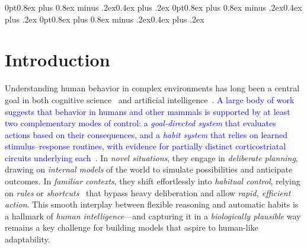 \documentclass{article} %
\newcommand{\revise}[1]{\textcolor{blue}{#1}}
\begin{document}
\titlespacing*{\section}
{0pt}{0.8ex plus 0.8ex minus .2ex}{0.4ex plus .2ex}
\titlespacing*{\subsection}
{0pt}{0.8ex plus 0.8ex minus .2ex}{0.4ex plus .2ex}
\titlespacing*{\subsubsection}
{0pt}{0.8ex plus 0.8ex minus .2ex}{0.4ex plus .2ex}

\setlength{\abovedisplayskip}{0.5pt}
\setlength{\abovedisplayshortskip}{0pt}
\setlength{\belowdisplayskip}{0.5pt}
\setlength{\belowdisplayshortskip}{0pt}
\setlength{\jot}{2pt}
\setlength{\floatsep}{1.2ex}
\setlength{\textfloatsep}{1.2ex}
\setlength{\intextsep}{0.5ex}
\setlength{\topsep}{0.3ex}
\setlength{\partopsep}{0pt}
\setlength{\parskip}{0.3ex}

\section{Introduction}
\label{sec:intro}

Understanding human behavior in complex environments has long been a central goal in both cognitive science~\citep{pylyshyn1980computation} and artificial intelligence~\citep{leichtmann2023effects}. \revise{A large body of work suggests that behavior in humans and other mammals is supported by at least two complementary modes of control: a {\it goal-directed system} that evaluates actions based on their consequences, and a {\it habit system} that relies on learned stimulus–response routines, with evidence for partially distinct corticostriatal circuits underlying each~\citep{balleine2010human,dolan2013goals}.}
In \emph{novel situations}, they engage in \emph{deliberate planning}, drawing on \emph{internal models} of the world to simulate possibilities and anticipate outcomes. In \emph{familiar contexts}, they shift effortlessly into \emph{habitual control}, relying on \emph{rules} or \emph{shortcuts}~\citep{neal2012habits} that bypass heavy deliberation and allow \emph{rapid, efficient action}. This smooth interplay between flexible reasoning and automatic habits is a hallmark of \emph{human intelligence}—and capturing it in a \emph{biologically plausible} way remains a key challenge for building models that aspire to human-like adaptability.
\end{document}
